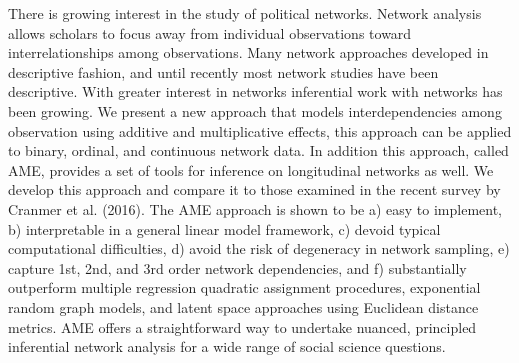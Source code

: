 There is growing interest in the study of political networks. Network analysis allows scholars to focus away from  individual observations toward interrelationships among observations. Many network approaches developed in descriptive fashion, and until recently most network studies have been descriptive. With greater interest in networks inferential work with networks has been growing. We present a new approach that models interdependencies among observation using additive and multiplicative effects, this approach can be applied to binary, ordinal, and continuous network data. In addition this approach, called AME, provides a set of tools for inference on longitudinal networks as well.  We develop this approach and compare it to those examined in the recent survey by Cranmer et al. (2016).  The AME approach is shown to be a) easy to implement, b) interpretable in a general linear model framework, c) devoid typical computational difficulties, d) avoid the risk of degeneracy in network sampling, e) capture 1st, 2nd, and 3rd order network dependencies, and f) substantially outperform multiple regression quadratic assignment procedures, exponential random graph models, and latent space approaches using  Euclidean distance metrics. AME offers a straightforward way to undertake nuanced, principled inferential network analysis for a wide range of social science questions. 


